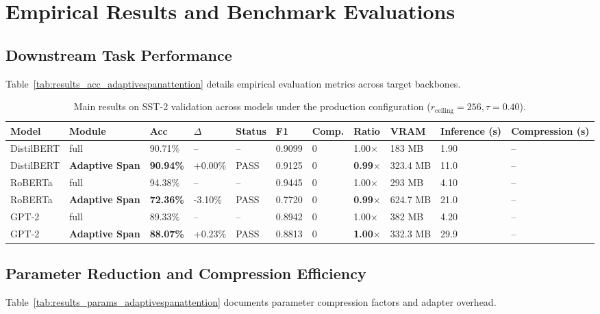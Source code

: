 \section{Empirical Results and Benchmark Evaluations}

\subsection{Downstream Task Performance}
Table~\ref{tab:results_acc_adaptivespanattention} details empirical evaluation metrics across target backbones.

\begin{table}[t]
\centering
\small
\begin{tabular}{lllllllllll}
\toprule
\textbf{Model} & \textbf{Module} & \textbf{Acc} & \textbf{$\Delta$} & \textbf{Status} & \textbf{F1} & \textbf{Comp.} & \textbf{Ratio} & \textbf{VRAM} & \textbf{Inference (s)} & \textbf{Compression (s)} \\
\midrule
DistilBERT & full & 90.71\% & -- & -- & 0.9099 & 0 & 1.00$\times$ & 183 MB & 1.90 & -- \\
DistilBERT & \textbf{Adaptive Span} & \textbf{90.94\%} & +0.00\% & PASS & 0.9125 & 0 & \textbf{0.99$\times$} & 323.4 MB & 11.0 & -- \\
RoBERTa & full & 94.38\% & -- & -- & 0.9445 & 0 & 1.00$\times$ & 293 MB & 4.10 & -- \\
RoBERTa & \textbf{Adaptive Span} & \textbf{72.36\%} & -3.10\% & PASS & 0.7720 & 0 & \textbf{0.99$\times$} & 624.7 MB & 21.0 & -- \\
GPT-2 & full & 89.33\% & -- & -- & 0.8942 & 0 & 1.00$\times$ & 382 MB & 4.20 & -- \\
GPT-2 & \textbf{Adaptive Span} & \textbf{88.07\%} & +0.23\% & PASS & 0.8813 & 0 & \textbf{1.00$\times$} & 332.3 MB & 29.9 & -- \\
\bottomrule
\end{tabular}
\caption{Main results on SST-2 validation across models under the production configuration ($r_{\mathrm{ceiling}}=256, \tau=0.40$).}
\label{tab:main_sst2}
\end{table}

\subsection{Parameter Reduction and Compression Efficiency}
Table~\ref{tab:results_params_adaptivespanattention} documents parameter compression factors and adapter overhead.

